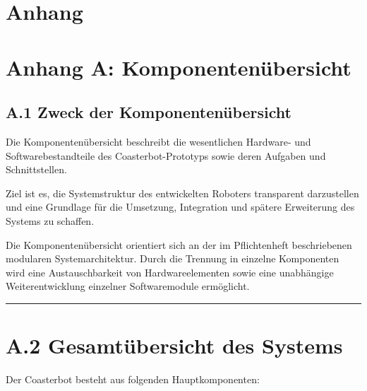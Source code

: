 \documentclass[
]{article}
\begin{document}
\section{Anhang}\label{anhang}

\section{Anhang A:
Komponentenübersicht}\label{anhang-a-komponentenuxfcbersicht}

\subsection{A.1 Zweck der
Komponentenübersicht}\label{a.1-zweck-der-komponentenuxfcbersicht}

Die Komponentenübersicht beschreibt die wesentlichen Hardware- und
Softwarebestandteile des Coasterbot-Prototyps sowie deren Aufgaben und
Schnittstellen.

Ziel ist es, die Systemstruktur des entwickelten Roboters transparent
darzustellen und eine Grundlage für die Umsetzung, Integration und
spätere Erweiterung des Systems zu schaffen.

Die Komponentenübersicht orientiert sich an der im Pflichtenheft
beschriebenen modularen Systemarchitektur. Durch die Trennung in
einzelne Komponenten wird eine Austauschbarkeit von Hardwareelementen
sowie eine unabhängige Weiterentwicklung einzelner Softwaremodule
ermöglicht.

\begin{center}\rule{0.5\linewidth}{0.5pt}\end{center}

\section{A.2 Gesamtübersicht des
Systems}\label{a.2-gesamtuxfcbersicht-des-systems}

Der Coasterbot besteht aus folgenden Hauptkomponenten:
\end{document}
